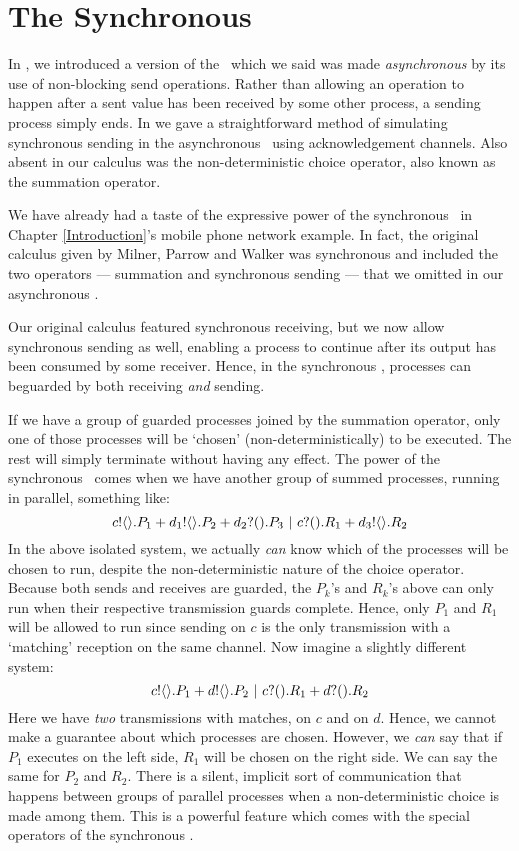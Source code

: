 \chapter{The Synchronous \Picalc}\label{sync_and_express}
In , we introduced a version of the \picalc\ which we said was made \emph{asynchronous} by its use of non-blocking send operations.  
Rather than allowing an operation to happen after a sent value has been received by some other process, a sending process simply ends.  
In  we gave a straightforward method of simulating synchronous sending in the asynchronous \picalc\ using acknowledgement channels.  
Also absent in our calculus was the non-deterministic choice operator, also known as the summation operator.  

We have already had a taste of the expressive power of the synchronous \picalc\ in Chapter \ref{Introduction}'s mobile phone network example.  In fact, the original calculus given by Milner, Parrow and Walker was synchronous and included the two operators --- summation and synchronous sending --- that we omitted in our asynchronous \picalc.  

Our original calculus featured synchronous receiving, but we now allow synchronous sending as well, enabling a process to continue after its output has been consumed by some receiver.  
Hence, in the synchronous \picalc, processes can beguarded by both receiving \emph{and} sending.  


If we have a group of guarded processes joined by the summation operator, only one of those processes will be `chosen' (non-deterministically) to be executed.  
The rest will simply terminate without having any effect.  
The power of the synchronous \picalc\ comes when we have another group of summed processes, running in parallel, something like: 
\[
	{c}!\langle{}\rangle.P_1 + {d_1}!\langle{}\rangle.P_2 + {d_2}?({}).P_3 \ |\  {c}?({}).R_1 + {d_3}!\langle{}\rangle.R_2
\]
In the above isolated system, we actually \emph{can} know which of the processes will be chosen to run, despite the non-deterministic nature of the choice operator.  
Because both sends and receives are guarded, the $P_k$'s and $R_k$'s above can only run when their respective transmission guards complete.  
Hence, only $P_1$ and $R_1$ will be allowed to run since sending on $c$ is the only transmission with a `matching' reception on the same channel.  
Now imagine a slightly different system:
\[
	{c}!\langle{}\rangle.P_1 + {d}!\langle{}\rangle.P_2 \ |\  {c}?({}).R_1 + {d}?({}).R_2
\]
Here we have \emph{two} transmissions with matches, on $c$ and on $d$.  
Hence, we cannot make a guarantee about which processes are chosen.  
However, we \emph{can} say that if $P_1$ executes on the left side, $R_1$ will be chosen on the right side.  
We can say the same for $P_2$ and $R_2$.  
There is a silent, implicit sort of communication that happens between groups of parallel processes when a non-deterministic choice is made among them.  
This is a powerful feature which comes with the special operators of the synchronous \picalc.  

